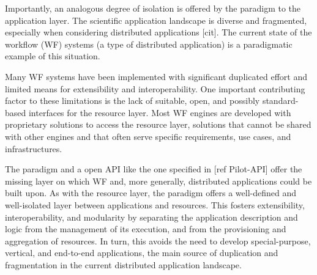 \documentclass{sig-alternate}
\begin{document}



Importantly, an analogous degree of isolation is offered by the \pilot paradigm
to the application layer. The scientific application landscape is diverse and
fragmented, especially when considering distributed applications [cit]. The
current state of the workflow (WF) systems (a type of distributed application)
is a paradigmatic example of this situation.

Many WF systems have been implemented with significant duplicated effort and
limited means for extensibility and interoperability. One important
contributing factor to these limitations is the lack of suitable, open, and
possibly standard-based interfaces for the resource layer. Most WF engines are
developed with proprietary solutions to access the resource layer, solutions
that cannot be shared with other engines and that often serve specific
requirements, use cases, and infrastructures.

The \pilot paradigm and a open \pilot API like the one specified in [ref
Pilot-API] offer the missing layer on which WF and, more generally, distributed
applications could be built upon. As with the resource layer, the \pilot
paradigm offers a well-defined and well-isolated layer between applications and
resources. This fosters extensibility, interoperability, and modularity by
separating the application description and logic from the management of its
execution, and from the provisioning and aggregation of resources. In turn,
this avoids the need to develop special-purpose, vertical, and end-to-end
applications, the main source of duplication and fragmentation in the current
distributed application landscape.
\end{document}
